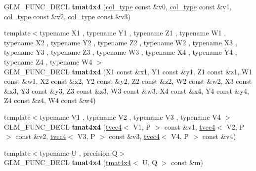 \begin{DoxyCompactItemize}
\item 
\hypertarget{structglm_1_1detail_1_1tmat4x4_a65b09ee09ead59d815720ec0e73737fb}{G\-L\-M\-\_\-\-F\-U\-N\-C\-\_\-\-D\-E\-C\-L {\bfseries tmat4x4} (\hyperlink{structglm_1_1detail_1_1tvec4}{col\-\_\-type} const \&v0, \hyperlink{structglm_1_1detail_1_1tvec4}{col\-\_\-type} const \&v1, \hyperlink{structglm_1_1detail_1_1tvec4}{col\-\_\-type} const \&v2, \hyperlink{structglm_1_1detail_1_1tvec4}{col\-\_\-type} const \&v3)}\label{structglm_1_1detail_1_1tmat4x4_a65b09ee09ead59d815720ec0e73737fb}

\item 
\hypertarget{structglm_1_1detail_1_1tmat4x4_afe1431c016d4a0261e597d4c4794d45c}{{\footnotesize template$<$typename X1 , typename Y1 , typename Z1 , typename W1 , typename X2 , typename Y2 , typename Z2 , typename W2 , typename X3 , typename Y3 , typename Z3 , typename W3 , typename X4 , typename Y4 , typename Z4 , typename W4 $>$ }\\G\-L\-M\-\_\-\-F\-U\-N\-C\-\_\-\-D\-E\-C\-L {\bfseries tmat4x4} (X1 const \&x1, Y1 const \&y1, Z1 const \&z1, W1 const \&w1, X2 const \&x2, Y2 const \&y2, Z2 const \&z2, W2 const \&w2, X3 const \&x3, Y3 const \&y3, Z3 const \&z3, W3 const \&w3, X4 const \&x4, Y4 const \&y4, Z4 const \&z4, W4 const \&w4)}\label{structglm_1_1detail_1_1tmat4x4_afe1431c016d4a0261e597d4c4794d45c}

\item 
\hypertarget{structglm_1_1detail_1_1tmat4x4_a1d5edd29def5b7c600505373f7dab5a2}{{\footnotesize template$<$typename V1 , typename V2 , typename V3 , typename V4 $>$ }\\G\-L\-M\-\_\-\-F\-U\-N\-C\-\_\-\-D\-E\-C\-L {\bfseries tmat4x4} (\hyperlink{structglm_1_1detail_1_1tvec4}{tvec4}$<$ V1, P $>$ const \&v1, \hyperlink{structglm_1_1detail_1_1tvec4}{tvec4}$<$ V2, P $>$ const \&v2, \hyperlink{structglm_1_1detail_1_1tvec4}{tvec4}$<$ V3, P $>$ const \&v3, \hyperlink{structglm_1_1detail_1_1tvec4}{tvec4}$<$ V4, P $>$ const \&v4)}\label{structglm_1_1detail_1_1tmat4x4_a1d5edd29def5b7c600505373f7dab5a2}

\item 
\hypertarget{structglm_1_1detail_1_1tmat4x4_a075d7a65803598d3f219f23ca08ba21f}{{\footnotesize template$<$typename U , precision Q$>$ }\\G\-L\-M\-\_\-\-F\-U\-N\-C\-\_\-\-D\-E\-C\-L {\bfseries tmat4x4} (\hyperlink{structglm_1_1detail_1_1tmat4x4}{tmat4x4}$<$ U, Q $>$ const \&m)}\label{structglm_1_1detail_1_1tmat4x4_a075d7a65803598d3f219f23ca08ba21f}


\end{DoxyCompactItemize}
